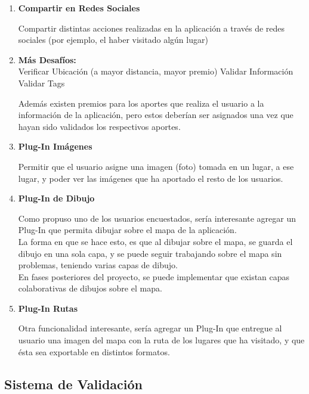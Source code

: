 \documentclass[10pt,letterpaper]{article}
\begin{document}
\begin{enumerate}
\begin{itemize}
\end{itemize}

\item \textbf{Compartir en Redes Sociales}

Compartir distintas acciones realizadas en la aplicación a través de redes sociales (por ejemplo, el haber visitado algún lugar)

\item \textbf{Más Desafíos:}\\

Verificar Ubicación (a mayor distancia, mayor premio)
Validar Información
Validar Tags

Además existen premios para los aportes que realiza el usuario a la información de la aplicación, pero estos deberían ser asignados una vez que hayan sido validados los respectivos aportes.\\

\item \textbf{Plug-In Imágenes}

Permitir que el usuario asigne una imagen (foto) tomada en un lugar, a ese lugar, y poder ver las imágenes que ha aportado el resto de los usuarios.\\

\item \textbf{Plug-In de Dibujo}

Como propuso uno de los usuarios encuestados, sería interesante agregar un Plug-In que permita dibujar sobre el mapa de la aplicación.\\

La forma en que se hace esto, es que al dibujar sobre el mapa, se guarda el dibujo en una sola capa, y se puede seguir trabajando sobre el mapa sin problemas, teniendo varias capas de dibujo.\\

En fases posteriores del proyecto, se puede implementar que existan capas colaborativas de dibujos sobre el mapa.\\

\item \textbf{Plug-In Rutas}

Otra funcionalidad interesante, sería agregar un Plug-In que entregue al usuario una imagen del mapa con la ruta de los lugares que ha visitado, y que ésta sea exportable en distintos formatos.\\

\end{enumerate}


\subsection{Sistema de Validación}
\end{document}
